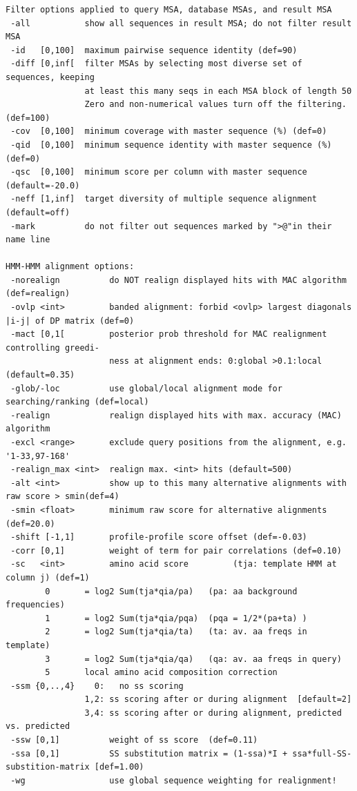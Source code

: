\documentclass[11pt,a4paper]{article}
\begin{document}
\begin{verbatim}
Filter options applied to query MSA, database MSAs, and result MSA              
 -all           show all sequences in result MSA; do not filter result MSA      
 -id   [0,100]  maximum pairwise sequence identity (def=90)
 -diff [0,inf[  filter MSAs by selecting most diverse set of sequences, keeping 
                at least this many seqs in each MSA block of length 50 
                Zero and non-numerical values turn off the filtering. (def=100) 
 -cov  [0,100]  minimum coverage with master sequence (%) (def=0)             
 -qid  [0,100]  minimum sequence identity with master sequence (%) (def=0)    
 -qsc  [0,100]  minimum score per column with master sequence (default=-20.0)    
 -neff [1,inf]  target diversity of multiple sequence alignment (default=off)   
 -mark          do not filter out sequences marked by ">@"in their name line  

HMM-HMM alignment options:                                                       
 -norealign          do NOT realign displayed hits with MAC algorithm (def=realign)   
 -ovlp <int>         banded alignment: forbid <ovlp> largest diagonals |i-j| of DP matrix (def=0)
 -mact [0,1[         posterior prob threshold for MAC realignment controlling greedi- 
                     ness at alignment ends: 0:global >0.1:local (default=0.35)       
 -glob/-loc          use global/local alignment mode for searching/ranking (def=local)
 -realign            realign displayed hits with max. accuracy (MAC) algorithm 
 -excl <range>       exclude query positions from the alignment, e.g. '1-33,97-168' 
 -realign_max <int>  realign max. <int> hits (default=500)                        
 -alt <int>          show up to this many alternative alignments with raw score > smin(def=4)  
 -smin <float>       minimum raw score for alternative alignments (def=20.0)  
 -shift [-1,1]       profile-profile score offset (def=-0.03)                         
 -corr [0,1]         weight of term for pair correlations (def=0.10)                
 -sc   <int>         amino acid score         (tja: template HMM at column j) (def=1)
        0       = log2 Sum(tja*qia/pa)   (pa: aa background frequencies)    
        1       = log2 Sum(tja*qia/pqa)  (pqa = 1/2*(pa+ta) )               
        2       = log2 Sum(tja*qia/ta)   (ta: av. aa freqs in template)     
        3       = log2 Sum(tja*qia/qa)   (qa: av. aa freqs in query)        
        5       local amino acid composition correction                     
 -ssm {0,..,4}    0:   no ss scoring                                             
                1,2: ss scoring after or during alignment  [default=2]         
                3,4: ss scoring after or during alignment, predicted vs. predicted
 -ssw [0,1]          weight of ss score  (def=0.11)                                  
 -ssa [0,1]          SS substitution matrix = (1-ssa)*I + ssa*full-SS-substition-matrix [def=1.00)
 -wg                 use global sequence weighting for realignment!                   


\end{verbatim}
\end{document}
